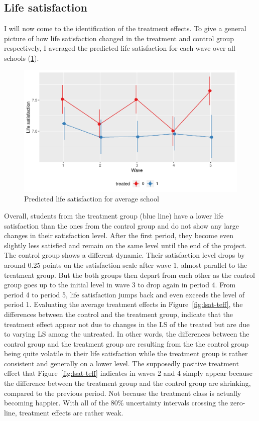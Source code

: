\documentclass[a4, 12pt]{article}
\begin{document}
\hypertarget{life-satisfaction}{%
\subsection{Life satisfaction}\label{life-satisfaction}}

\label{sec:life-satisfaction}
I will now come to the identification of the treatment effects. To give a general picture of how life satisfaction changed in the treatment and control group respectively, I averaged the predicted life satisfaction for each wave over all schools (\ref{fig:lsat-pred}).

\begin{figure}[H]

{\centering \includegraphics[width=0.8\linewidth,]{../figures/lsat_pred} 

}

\caption{Predicted life satisfaction for average school}\label{fig:lsat-pred}
\end{figure}

Overall, students from the treatment group (blue line) have a lower life satisfaction than the ones from the control group and do not show any large changes in their satisfaction level. After the first period, they become even slightly less satisfied and remain on the same level until the end of the project. The control group shows a different dynamic. Their satisfaction level drops by around 0.25 points on the satisfaction scale after wave 1, almost parallel to the treatment group. But the both groups then depart from each other as the control group goes up to the initial level in wave 3 to drop again in period 4. From period 4 to period 5, life satisfaction jumps back and even exceeds the level of period 1. Evaluating the average treatment effects in Figure~\ref{fig:lsat-teff}, the differences between the control and the treatment group, indicate that the treatment effect appear not due to changes in the LS of the treated but are due to varying LS among the untreated. In other words, the differences between the control group and the treatment group are resulting from the the control group being quite volatile in their life satisfaction while the treatment group is rather consistent and generally on a lower level. The supposedly positive treatment effect that Figure~\ref{fig:lsat-teff} indicates in waves 2 and 4 simply appear because the difference between the treatment group and the control group are shrinking, compared to the previous period. Not because the treatment class is actually becoming happier. With all of the 80\% uncertainty intervals crossing the zero-line, treatment effects are rather weak.
\end{document}
